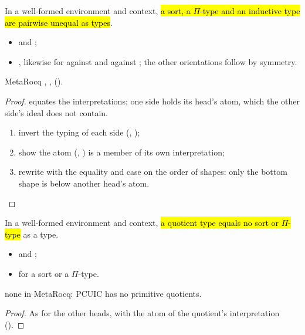 \begin{lemma}
  \label{lem:EraseProof-TypeEq-sort_ne_forallE}
  \leanok
   In a well-formed environment and context, \hl{a sort, a $\Pi$-type and an
  inductive type are pairwise unequal as types}.
  \begin{itemize}
  \item {}  and ;
  \item {} ,
        likewise for  against  and  against ; the
        other orientations follow by symmetry.
  \end{itemize}
   MetaRocq ,
  , 
  ().
\end{lemma}
\begin{proof}
  \leanok
    equates the interpretations; one side
  holds its head's atom, which the other side's ideal does not contain.
  \begin{enumerate}
  \item invert the typing of each side (, );
  \item show the atom (, ) is a member of its own interpretation;
  \item rewrite with the equality and case on the order of shapes: only the bottom shape is below
        another head's atom.
  \end{enumerate}
\end{proof}

\begin{lemma}
  \label{lem:EraseProof-TypeEq-sort_ne_quot}
  \leanok
   In a well-formed environment and context, \hl{a quotient type equals no sort
  or $\Pi$-type} as a type.
  \begin{itemize}
  \item {}  and ;
  \item {}  for
         a sort or a $\Pi$-type.
  \end{itemize}
   none in MetaRocq: PCUIC has no primitive quotients.
\end{lemma}
\begin{proof}
  \leanok
   As for the other heads, with the atom  of the quotient's
  interpretation ().
\end{proof}

